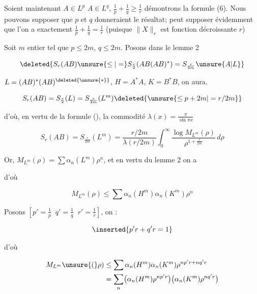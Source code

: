 Soient maintenant  $A\in L^p$ $A\in L^q$, $\frac1p+\frac1q\geq\frac1r$ démontrons la formule (6). Nous pouvons supposer  que $p$ et $q$    donneraient le résultat;   peut supposer évidemment  que l'on a exactement $\frac1p+\frac1q=\frac1r$ (puisque $\|X\|_r$ est fonction décroissante  $r$)

Soit $m$  entier tel que $p\leq 2m$, $q\leq 2m$.  Posons  dans le lemme 2


\[
\deleted{S_r(AB)\unsure{\leq|=} S_{\frac r2}(AB(AB)^*)=S_{\frac r{2m}}\unsure{A|L}}
\]

$L=(AB)^*(AB)^{\deleted{\unsure{*}}}$, $H=A^*A$, $K=B^*B$, on aura.

\[
S_r(AB)=S_{\frac r2}(L)=S_{\frac r{2m}}(L^m)\deleted{\unsure{\leq p+2m|=r/2m}}
\]

d'où, en vertu de la formule (),   la commodité $\lambda(x)=\frac{\pi}{\sin\pi x}$

\[
S_r(AB)=S_{\frac r{2m}}(L^m)=\frac{r/2m}{\lambda(r/2m)}
\int_0^\infty\frac{\log M_{L^m}(\rho)}{\rho^{1+\frac r{2m}}}\,d\rho \tag*{(11)}
\]

 Or, $M_{L^m}(\rho)=\sum\alpha_n(L^m)\rho^n$, et   en vertu du lemme 2 on a 


d'où

\[
M_{L^m}(\rho)\leq\sum\alpha_n(H^m)\alpha_n(K^m)\rho^n
\]

Posons $\left[p'=\frac1p\;\;q'=\frac1q\;\;r'=\frac1r\right]$, on : 

\[
\inserted{p'r+q'r=1}
\]

d'où

\[
\begin{aligned}
M_{L^m}\unsure{(}\rho)&\leq\sum\alpha_n(H^m)\alpha_n(K^m)\rho^{np'r+nq'r}\\
&=\sum_n\bigl(\alpha_n(H^m)\rho^{np'r}\bigr)
\bigl(\alpha_n(K^m)\rho^{nq'r}\bigr)
\end{aligned}
\]
